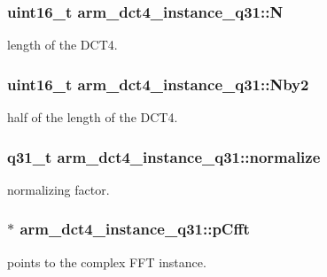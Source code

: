 \subsubsection[{\texorpdfstring{N}{N}}]{\setlength{\rightskip}{0pt plus 5cm}uint16\+\_\+t arm\+\_\+dct4\+\_\+instance\+\_\+q31\+::N}\hypertarget{structarm__dct4__instance__q31_a46a9f136457350676e2bfd3768ff9d6d}{}\label{structarm__dct4__instance__q31_a46a9f136457350676e2bfd3768ff9d6d}
length of the D\+C\+T4. 
\subsubsection[{\texorpdfstring{Nby2}{Nby2}}]{\setlength{\rightskip}{0pt plus 5cm}uint16\+\_\+t arm\+\_\+dct4\+\_\+instance\+\_\+q31\+::\+Nby2}\hypertarget{structarm__dct4__instance__q31_a32d3268ba4629908dba056599f0a904d}{}\label{structarm__dct4__instance__q31_a32d3268ba4629908dba056599f0a904d}
half of the length of the D\+C\+T4. 
\subsubsection[{\texorpdfstring{normalize}{normalize}}]{\setlength{\rightskip}{0pt plus 5cm}q31\+\_\+t arm\+\_\+dct4\+\_\+instance\+\_\+q31\+::normalize}\hypertarget{structarm__dct4__instance__q31_ac80ff7b28fca36aeef74dea12e8312dd}{}\label{structarm__dct4__instance__q31_ac80ff7b28fca36aeef74dea12e8312dd}
normalizing factor. 
\subsubsection[{\texorpdfstring{p\+Cfft}{pCfft}}]{$\ast$ arm\+\_\+dct4\+\_\+instance\+\_\+q31\+::p\+Cfft}\hypertarget{structarm__dct4__instance__q31_ac96579cfb28d08bb11dd2fe4c6303833}{}\label{structarm__dct4__instance__q31_ac96579cfb28d08bb11dd2fe4c6303833}
points to the complex F\+FT instance. 

